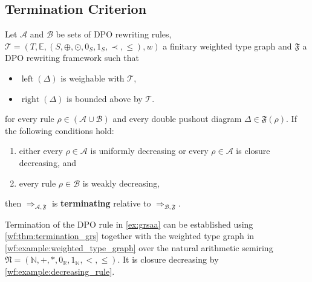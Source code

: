 \subsection{Termination Criterion}
\label{wf:sec:termination}
\begin{theorem} 
    \label{wf:thm:termination_grs}
    Let $\mathcal{A}$ and $\mathcal{B}$ be sets of DPO rewriting rules, $\mathcal{T} = (T,\mathbb{E}, (S, \oplus, \odot, 0_S, 1_S, \prec, \leq), w)$ a finitary weighted type graph and $\mathfrak{F}$ a DPO rewriting framework such that

        \begin{itemize}
            \item \(\operatorname{left}(\Delta)\) is weighable with \(\mathcal{T}\),
            \item \(\operatorname{right}(\Delta)\) is bounded above by \(\mathcal{T}\). 
        \end{itemize}
    for every rule $\rho \in (\mathcal{A }\cup \mathcal{B })$ and every double pushout diagram  
        $\Delta \in \mathfrak{F}(\rho)$. If the following conditions hold:
    \begin{enumerate}
        \item either every $\rho \in \mathcal{A}$ is uniformly decreasing or every $\rho \in \mathcal{A}$ is closure decreasing, and
        \item every rule $\rho \in \mathcal{B}$ is weakly decreasing,
    \end{enumerate}
    then $\Rightarrow_{\mathcal{A},\mathfrak{F}}$ is \textbf{terminating} relative to $\Rightarrow_{\mathcal{B},\mathfrak{F}}$.
\end{theorem} 
\begin{example} 
    \label{wf:example:termination}
    Termination of the DPO rule in \autoref{ex:grsaa} can be established using \autoref{wf:thm:termination_grs} together with the weighted type graph in \autoref{wf:example:weighted_type_graph} over the natural arithmetic semiring $\mathfrak{N} = (\mathbb{N},+,*,0_\mathbb{R},1_\mathbb{N},<,\leq)$. It is closure decreasing by \autoref{wf:example:decreasing_rule}.
\end{example}
